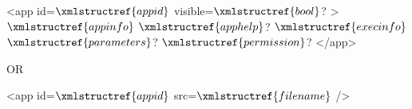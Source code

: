 <app id=$\xmlstructref{appid}$ visible=$\xmlstructref{bool}$? >
  $\xmlstructref{appinfo}$
  $\xmlstructref{apphelp}$?
  $\xmlstructref{execinfo}$
  $\xmlstructref{parameters}$?
  $\xmlstructref{permission}$?
</app>

OR

<app id=$\xmlstructref{appid}$ src=$\xmlstructref{filename}$ />
